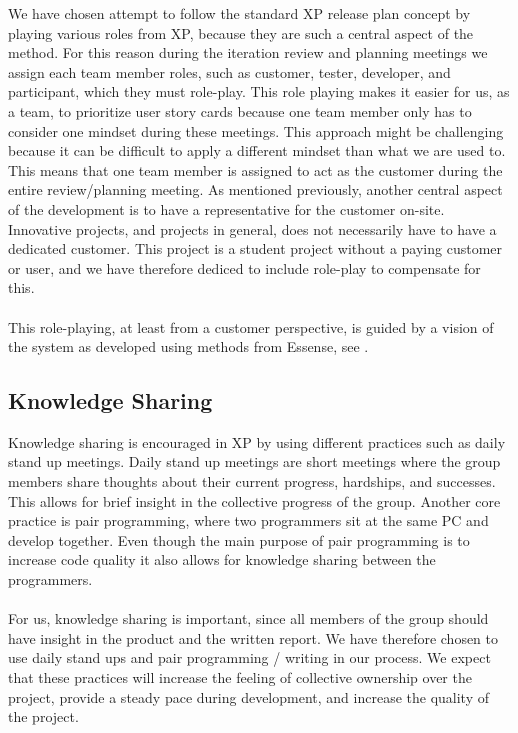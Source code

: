We have chosen attempt to follow the standard XP release plan concept by playing various roles from XP, because they are such a central aspect of the method. For this reason during the iteration review and planning meetings we assign each team member roles, such as customer, tester, developer, and participant, which they must role-play. This role playing makes it easier for us, as a team, to prioritize user story cards because one team member only has to consider one mindset during these meetings. This approach might be challenging because it can be difficult to apply a different mindset than what we are used to. This means that one team member is assigned to act as the customer during the entire review/planning meeting. As mentioned previously, another central aspect of the development is to have a representative for the customer on-site. Innovative projects, and projects in general, does not necessarily have to have a dedicated customer. This project is a student project without a paying customer or user, and we have therefore dediced to include role-play to compensate for this. 
\\\\
This role-playing, at least from a customer perspective, is guided by a vision of the system as developed using methods from Essense, see .

\subsection{Knowledge Sharing}
\label{sub:knowledge_sharing}
Knowledge sharing is encouraged in XP by using different practices such as daily stand up meetings. Daily stand up meetings are short meetings where the group members share thoughts about their current progress, hardships, and successes. This allows for brief insight in the collective progress of the group. Another core practice is pair programming, where two programmers sit at the same PC and develop together. Even though the main purpose of pair programming is to increase code quality it also allows for knowledge sharing between the programmers. 
\\\\ 
For us, knowledge sharing is important, since all members of the group should have insight in the product and the written report. We have therefore chosen to use daily stand ups and pair programming / writing in our process. We expect that these practices will increase the feeling of collective ownership over the project, provide a steady pace during development, and increase the quality of the project. 


